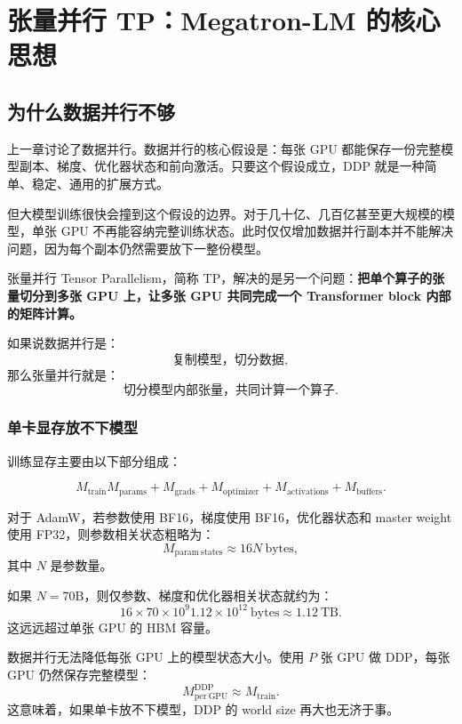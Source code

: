 \chapter{张量并行 TP：Megatron-LM 的核心思想}
\label{chap:tensor-parallelism}

\section{为什么数据并行不够}
\label{sec:why-data-parallel-not-enough}

上一章讨论了数据并行。数据并行的核心假设是：每张 GPU 都能保存一份完整模型副本、梯度、优化器状态和前向激活。只要这个假设成立，DDP 就是一种简单、稳定、通用的扩展方式。

但大模型训练很快会撞到这个假设的边界。对于几十亿、几百亿甚至更大规模的模型，单张 GPU 不再能容纳完整训练状态。此时仅仅增加数据并行副本并不能解决问题，因为每个副本仍然需要放下一整份模型。

张量并行 Tensor Parallelism，简称 TP，解决的是另一个问题：\textbf{把单个算子的张量切分到多张 GPU 上，让多张 GPU 共同完成一个 Transformer block 内部的矩阵计算。}

如果说数据并行是：
\[
\text{复制模型，切分数据},
\]
那么张量并行就是：
\[
\text{切分模型内部张量，共同计算一个算子}.
\]

\subsection{单卡显存放不下模型}
\label{subsec:model-does-not-fit-single-gpu}

训练显存主要由以下部分组成：

\[
M_{\mathrm{train}}
M_{\mathrm{params}}
+
M_{\mathrm{grads}}
+
M_{\mathrm{optimizer}}
+
M_{\mathrm{activations}}
+
M_{\mathrm{buffers}}.
\]

对于 AdamW，若参数使用 BF16，梯度使用 BF16，优化器状态和 master weight 使用 FP32，则参数相关状态粗略为：
\[
M_{\mathrm{param\ states}}\approx 16N\ \mathrm{bytes},
\]
其中 $N$ 是参数量。

如果 $N=70\mathrm{B}$，则仅参数、梯度和优化器相关状态就约为：
\[
16\times 70\times 10^9
1.12\times 10^{12}\ \mathrm{bytes}
\approx 1.12\ \mathrm{TB}.
\]
这远远超过单张 GPU 的 HBM 容量。

数据并行无法降低每张 GPU 上的模型状态大小。使用 $P$ 张 GPU 做 DDP，每张 GPU 仍然保存完整模型：
\[
M_{\mathrm{per\ GPU}}^{\mathrm{DDP}}
\approx
M_{\mathrm{train}}.
\]
这意味着，如果单卡放不下模型，DDP 的 world size 再大也无济于事。

